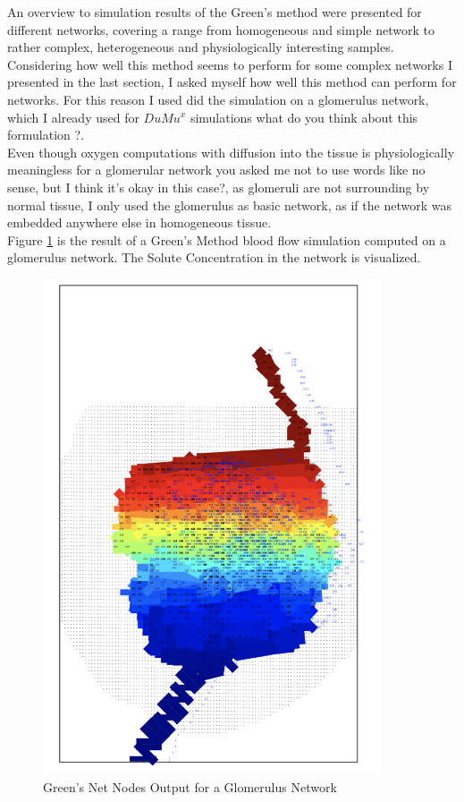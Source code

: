 An overview to simulation results of the Green's method were presented for different networks, covering a range from homogeneous and simple network to rather complex, heterogeneous and physiologically interesting samples.
\\Considering how well this method seems to perform for some complex networks I presented in the last section, I asked myself how well this method can perform for networks. For this reason I used did the simulation on a glomerulus network, which I already used for $DuMu^x$ simulations {\color{red} what do you think about this formulation ?}.
\\Even though oxygen computations with diffusion into the tissue is physiologically meaningless for a glomerular network {\color{red} you asked me not to use words like no sense, but I think it's okay in this case?}, as glomeruli are not surrounding by normal tissue, I only used the glomerulus as basic network, as if the network was embedded anywhere else in homogeneous tissue.
\\Figure \ref{fig:NetNodesSegs_Glom}  is the result of a Green's Method blood flow simulation computed on a glomerulus network. The Solute Concentration in the network is visualized.\\
\begin{figure}[h]
\centering
\includegraphics[width=100mm]{NetNodesSegs_Glom}
\caption{\footnotesize Green's Net Nodes Output for a Glomerulus Network}
\label{fig:NetNodesSegs_Glom}
\end{figure}
